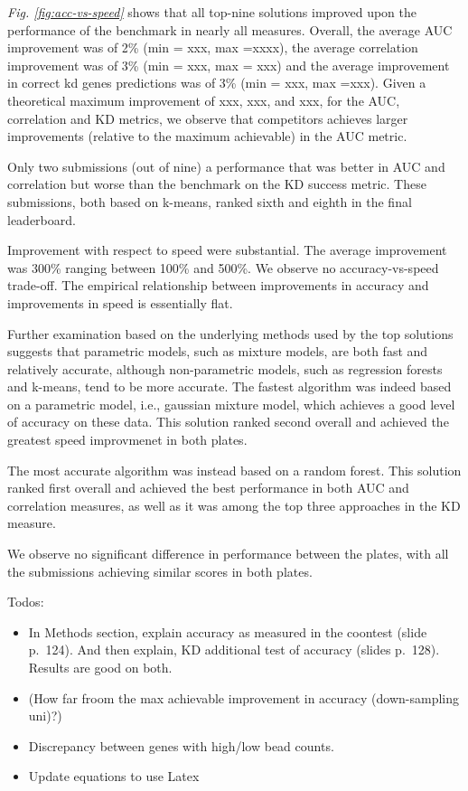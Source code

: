 \documentclass[]{article}
\providecommand{\tightlist}{%
  \setlength{\itemsep}{0pt}\setlength{\parskip}{0pt}}
\begin{document}
{\it Fig. \ref{fig:acc-vs-speed}} shows that all top-nine solutions
improved upon the performance of the benchmark in nearly all measures.
Overall, the average AUC improvement was of 2\% (min = xxx, max =xxxx),
the average correlation improvement was of 3\% (min = xxx, max = xxx)
and the average improvement in correct kd genes predictions was of 3\%
(min = xxx, max =xxx). Given a theoretical maximum improvement of xxx,
xxx, and xxx, for the AUC, correlation and KD metrics, we observe that
competitors achieves larger improvements (relative to the maximum
achievable) in the AUC metric.

Only two submissions (out of nine) a performance that was better in AUC
and correlation but worse than the benchmark on the KD success metric.
These submissions, both based on k-means, ranked sixth and eighth in the
final leaderboard.

Improvement with respect to speed were substantial. The average
improvement was 300\% ranging between 100\% and 500\%. We observe no
accuracy-vs-speed trade-off. The empirical relationship between
improvements in accuracy and improvements in speed is essentially flat.

Further examination based on the underlying methods used by the top
solutions suggests that parametric models, such as mixture models, are
both fast and relatively accurate, although non-parametric models, such
as regression forests and k-means, tend to be more accurate. The fastest
algorithm was indeed based on a parametric model, i.e., gaussian mixture
model, which achieves a good level of accuracy on these data. This
solution ranked second overall and achieved the greatest speed
improvmenet in both plates.

The most accurate algorithm was instead based on a random forest. This
solution ranked first overall and achieved the best performance in both
AUC and correlation measures, as well as it was among the top three
approaches in the KD measure.

We observe no significant difference in performance between the plates,
with all the submissions achieving similar scores in both plates.

\color{red}

Todos:

\begin{itemize}
\tightlist
\item
  In Methods section, explain accuracy as measured in the coontest
  (slide p.~124). And then explain, KD additional test of accuracy
  (slides p.~128). Results are good on both.
\item
  (How far froom the max achievable improvement in accuracy
  (down-sampling uni)?)
\item
  Discrepancy between genes with high/low bead counts.
\item
  Update equations to use Latex
\end{itemize}
\end{document}
